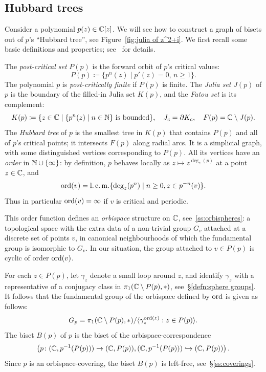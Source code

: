\documentclass{amsart}
\begin{document}
\subsection{Hubbard trees}\label{ss:hubbard tree}
Consider a polynomial $p(z)\in{\mathbb C}[z]$. We will see how to construct a
graph of bisets out of $p$'s ``Hubbard tree'', see
Figure~\ref{fig:julia of z^2+i}. We first recall some basic definitions and
properties; see~\cites{douady-h:edpc1,douady-h:edpc2} for details.

The \emph{post-critical set} $P(p)$ is the forward orbit of $p$'s
critical values:
\[P(p)\coloneqq\{p^n(z)\mid p'(z)=0,\,n\ge1\}.\]
The polynomial $p$ is \emph{post-critically finite} if $P(p)$ is
finite. The \emph{Julia set} $J(p)$ of $p$ is the boundary of the
filled-in Julia set $K(p)$, and the \emph{Fatou set} is its
complement:
\[K(p)\coloneqq\{z\in {\mathbb C}\mid \{p^n(z)\mid n\in{\mathbb N}\}\text{ is bounded}\},\quad J_c=\partial K_c,\quad F(p)={\mathbb C}\setminus J(p).
\]
The \emph{Hubbard tree} of $p$ is the smallest tree in $K(p)$ that
contains $P(p)$ and all of $p$'s critical points; it intersects $F(p)$
along radial arcs.  It is a simplicial graph, with some distinguished
vertices corresponding to $P(p)$. All its vertices have an
\emph{order} in ${\mathbb N}\cup\{\infty\}$: by definition, $p$ behaves locally
as $z\mapsto z^{\deg_z(p)}$ at a point $z\in{\mathbb C}$, and
\[\operatorname{ord}(v)=\operatorname{l.c.m.}\{\deg_z(p^n)\mid n\ge0,z\in p^{-n}(v)\}.\]
Thus in particular $\operatorname{ord}(v)=\infty$ if $v$ is critical and periodic.

This order function defines an \emph{orbispace} structure on ${\mathbb C}$,
see~\ref{ss:orbispheres}: a topological space with the extra data of a
non-trivial group $G_v$ attached at a discrete set of points $v$, in
canonical neighbourhoods of which the fundamental group is isomorphic
to $G_v$. In our situation, the group attached to $v\in P(p)$ is
cyclic of order $\operatorname{ord}(v)$.

For each $z\in P(p)$, let $\gamma_z$ denote a small loop around $z$, and
identify $\gamma_z$ with a representative of a conjugacy class in
$\pi_1({\mathbb C}\setminus P(p),*)$, see~\S\ref{defn:sphere groups}. It follows
that the fundamental group of the orbispace defined by $\operatorname{ord}$ is given as
follows:
\[G_p = \pi_1({\mathbb C}\setminus P(p),*)/\langle \gamma_z^{\operatorname{ord}(z)}:z\in P(p)\rangle.\]
The biset $B(p)$ of $p$ is the biset of the orbispace-correspondence
\[\left(p\colon ({\mathbb C}, p^{-1}(P(p)))\to ({\mathbb C}, P(p)) , ({\mathbb C},
    p^{-1}(P(p)))\hookrightarrow ({\mathbb C}, P(p)) \right).
\]
Since $p$ is an orbispace-covering, the biset $B(p)$ is left-free,
see~\S\ref{ss:coverings}.
\end{document}
